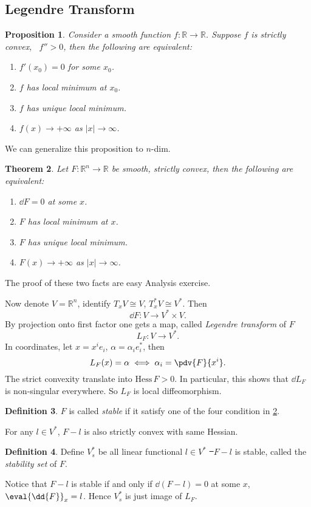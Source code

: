 \documentclass[12pt]{article}
\theoremstyle{plain}\newtheorem{theorem}{Theorem}
\theoremstyle{definition}\newtheorem{definition}[theorem]{Definition}
\theoremstyle{definition}\newtheorem{example}[theorem]{Example}
\theoremstyle{plain}\newtheorem{axiom}[theorem]{Axiom}
\theoremstyle{plain}\newtheorem{assertion}[theorem]{Assertion}
\theoremstyle{plain}\newtheorem{corollary}[theorem]{Corollary}
\theoremstyle{plain}\newtheorem{lemma}[theorem]{Lemma}
\theoremstyle{plain}\newtheorem{proposition}[theorem]{Proposition}
\theoremstyle{plain}\newtheorem{prop}[theorem]{Proposition}
\theoremstyle{plain}\newtheorem{conjecture}[theorem]{Conjecture}
\theoremstyle{plain}\newtheorem{conj}[theorem]{Conjecture}
\theoremstyle{plain}\newtheorem{problem}[theorem]{Problem}
\theoremstyle{remark}\newtheorem{notation}[theorem]{Notation}
\theoremstyle{definition}\newtheorem*{question}{Question}
\theoremstyle{definition}\newtheorem*{answer}{Answer}
\theoremstyle{definition}\newtheorem*{goal}{Goal}
\theoremstyle{plain}\newtheorem*{application}{Application}
\theoremstyle{plain}\newtheorem*{exercise}{Exercise}
\theoremstyle{remark}\newtheorem*{remark}{Remark}
\theoremstyle{remark}\newtheorem*{note}{\small{Note}}
\numberwithin{equation}{section}
\numberwithin{theorem}{section}
\numberwithin{figure}{section}
\begin{document}
\subsection{Legendre Transform}
\begin{prop}
    Consider a smooth function \(f\colon \mathbb{R}\to \mathbb{R}\). Suppose
    \(f\) is strictly convex, \ie\ \(f''>0\), then the following are equivalent:
    \begin{enumerate}[(1)]
    \item \(f'(x_0)=0\) for some \(x_0\).
    \item \(f\) has local minimum at \(x_0\).
    \item \(f\) has unique local minimum.
    \item \(f(x)\to +\infty\) as \(|x|\to \infty\).
    \end{enumerate}
\end{prop}
We can generalize this proposition to \(n\)-dim.
\begin{theorem}\label{thm:stable-convex}
    Let \(F\colon \mathbb{R}^n\to \mathbb{R}\) be smooth, strictly convex, then the
    following are equivalent:
    \begin{enumerate}[(1)]
    \item \(\dd{F}=0\) at some \(x\).
    \item \(F\) has local minimum at \(x\).
    \item \(F\) has unique local minimum.
    \item \(F(x)\to +\infty\) as \(|x|\to \infty\).
    \end{enumerate}
\end{theorem}
The proof of these two facts are easy Analysis exercise.

Now denote \(V=\mathbb{R}^n\), identify \(T_x V\cong V\), \(T_x^* V\cong V^*\). Then \[
    \dd{F}\colon V\longrightarrow V^*\times V
.\] By projection onto first factor one gets a map, called \emph{Legendre transform}
of \(F\) \[
    L_F\colon V\longrightarrow V^*
.\] In coordinates, let \(x=x^i e_i\), \(\alpha=\alpha_i e_i^*\), then \[
    L_F(x)=\alpha\iff \alpha_i=\pdv{F}{x^i}
.\] The strict convexity translate into \(\mathrm{Hess}\,F>0\). In particular, this
shows that \(\dd{L_F}\) is non-singular everywhere. So \(L_F\) is local diffeomorphism.
\begin{definition}
    \(F\) is called \emph{stable} if it satisfy one of the four condition in
    \cref{thm:stable-convex}.
\end{definition}
For any \(l\in V^*\), \(F-l\) is also strictly convex with same Hessian.
\begin{definition}
    Define \(V_s^*\) be all linear functional \(l\in V^*\) \st\ \(F-l\) is stable,
    called the \emph{stability set} of \(F\).
\end{definition}
Notice that \(F-l\) is stable if and only if \(\dd(F-l)=0\) at some \(x\), \ie\ 
\(\eval{\dd{F}}_x=l\). Hence \(V_s^*\) is just image of \(L_F\).
\end{document}
